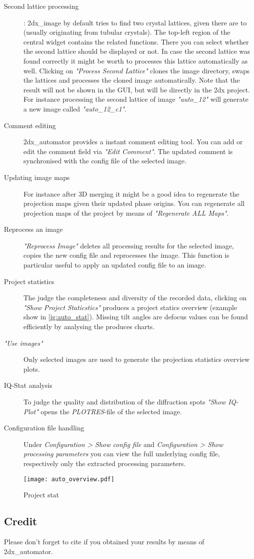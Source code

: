 \begin{description}
	\item [Second lattice processing]: 2dx\_image by default tries to find two crystal lattices, given there are to (usually originating from tubular crystals). The top-left region of the central widget contains the related functions. There you can select whether the second lattice should be displayed or not. In case the second lattice was found correctly it might be worth to processes this lattice automatically as well. Clicking on \textit{"Process Second Lattice"} clones the image directory, swaps the lattices and processes the cloned image automatically. Note that the result will not be shown in the GUI, but will be directly in the 2dx project. For instance processing the second lattice of image \textit{"auto\_12"} will generate a new image called \textit{"auto\_12\_c1"}. 
	\item [Comment editing] 2dx\_automator provides a instant comment editing tool. You can add or edit the comment field via \textit{"Edit Comment"}. The updated comment is synchronised with the config file of the selected image.
	\item [Updating image maps] For instance after 3D merging it might be a good idea to regenerate the projection maps given their updated phase origins. You can regenerate all projection maps of the project by means of \textit{"Regenerate ALL Maps"}.
	\item [Reprocess an image] \textit{"Reprocess Image"} deletes all processing results for the selected image, copies the new config file and reprocesses the image. This function is particular useful to apply an updated config file to an image.
	\item [Project statistics] The judge the completeness and diversity of the recorded data, clicking on \textit{"Show Project Staticstics"} produces a project statics overview (example show in \autoref{ig:auto_stat}). Missing tilt angles are defocus values can be found efficiently by analysing the produces charts.
	\item [\textit{"Use images"}] Only selected images are used to generate the projection statistics overview plots.
	\item [IQ-Stat analysis] To judge the quality and distribution of the diffraction spots \textit{"Show IQ-Plot"} opens the \textit{PLOTRES}-file of the selected image.
	\item [Configuration file handling] Under \textit{Configuration > Show config file} and  \textit{Configuration > Show processing parameters} you can view the full underlying config file, respectively only the extracted processing parameters.
\end{description}


\begin{figure}
	\centering
	\texttt{[image: auto\_overview.pdf]}
	\caption{Project stat}
	\label{fig:auto_stat}
\end{figure}

\subsection{Credit}
Please don't forget to cite \cite{scherer20142dx_automator} if you obtained your results by means of 2dx\_automator.